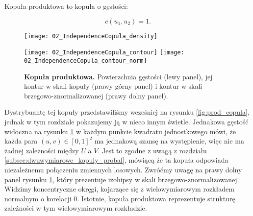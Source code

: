 \begin{df}
	Kopuła produktowa to kopuła o gęstości:
	
	$$ c(u_1, u_2) = 1.$$
	
\end{df}
\begin{figure}[h]
	\centering
	\begin{minipage}{0.5\linewidth}
		\texttt{[image: 02\_IndependenceCopula\_density]}
	\end{minipage}
	\begin{minipage}{0.45\linewidth}
		\texttt{[image: 02\_IndependenceCopula\_contour]}
		\texttt{[image: 02\_IndependenceCopula\_contour\_norm]}
	\end{minipage}
	\caption{\textbf{Kopuła produktowa.} Powierzchnia gęstości (lewy panel), jej kontur w skali kopuły (prawy górny panel) i kontur w skali brzegowo-znormalizowanej (prawy dolny panel). \label{fig:product_copula_density}}
\end{figure}

Dystrybuantę tej kopuły przedstawiliśmy wcześniej na rysunku \ref{fig:prod_copula}, jednak w tym rozdziale pokazujemy ją w nieco innym świetle. Jednakowa gęstość widoczna na rysunku \ref{fig:product_copula_density} w każdym punkcie kwadratu jednostkowego mówi, że każda para $(u, v) \in [0,1]^2$ ma jednakową szansę na występienie, więc nie ma żadnej zależności między $U$ a $V$. Jest to zgodne z uwagą z rozdziału \ref{subsec:dwuwymiarowe_kopuly_probal}, mówiącą że ta kopuła odpowiada niezależnemu połączeniu zmiennych losowych. Zwróćmy uwagę na prawy dolny panel rysunku \ref{fig:product_copula_density}, który prezentuje izohipsy w skali brzegowo-znormalizowanej. Widzimy koncentryczne okręgi, kojarzące się z wielowymiarowym rozkładem normalnym o korelacji $0$. Istotnie, kopuła produktowa reprezentuje strukturę zależności w tym wielowymiarowym rozkładzie.

